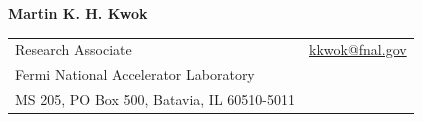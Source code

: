 \documentclass[letterpaper,11pt,oneside]{article}
\begin{document}
\linespread{1.1}



\noindent  \LARGE{\textbf{Martin K. H. Kwok}}  \\
\normalsize


\begin{center}
\begin{tabular}{l l}
Research Associate       & \hspace{1in}\href{mailto:kkwok@fnal.gov}{kkwok@fnal.gov}\\
Fermi National Accelerator Laboratory       \\
MS 205, PO Box 500, Batavia, IL 60510-5011    &  \\
\end{tabular}
\end{center}
\end{document}
